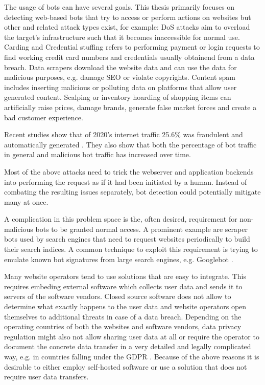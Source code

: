 \documentclass[
    fontsize=12pt,
    headings=small,
    parskip=half,           %
    bibliography=totoc,
    numbers=noenddot,       %
    open=any,               %
    final                   %
    ]{scrreprt}
\begin{document}
The usage of bots can have several goals. This thesis primarily focuses on detecting web-based bots that try to access or perform actions on websites but other and related attack types exist, for example:
DoS attacks aim to overload the target's infrastructure such that it becomes inaccessible for normal use. Carding and Credential stuffing refers to performing payment or login requests to find working credit card numbers and credentials usually obtainend from a data breach. Data scrapers download the website data and can use the data for malicious purposes, e.g. damage SEO or violate copyrights. Content spam includes inserting malicious or polluting data on platforms that allow user generated content. Scalping or inventory hoarding of shopping items can artificially raise prices, damage brands, generate false market forces and create a bad customer experience.

Recent studies show that of 2020's internet traffic 25.6\% was fraudulent and automatically generated \cite{BAD_BOT_REPORT2020} \cite{BAD_BOT_REPORT2021}. They also show that both the percentage of bot traffic in general and malicious bot traffic has increased over time.

Most of the above attacks need to trick the webserver and application backends into performing the request as if it had been initiated by a human. Instead of combating the resulting issues separately, bot detection could potentially mitigate many at once.

A complication in this problem space is the, often desired, requirement for non-malicious bots to be granted normal access. A prominent example are scraper bots used by search engines that need to request websites periodically to build their search indices. A common technique to exploit this requirement is trying to emulate known bot signatures from large search engines, e.g. Googlebot \cite{8421894}.

Many website operators tend to use solutions that are easy to integrate. This requires embeding external software which collects user data and sends it to servers of the software vendors. Closed source software does not allow to determine what exactly happens to the user data and website operators open themselves to additional threats in case of a data breach. Depending on the operating countries of both the websites and software vendors, data privacy regulation might also not allow sharing user data at all or require the operator to document the concrete data transfer in a very detailed and legally complicated way, e.g. in countries falling under the GDPR \cite{GDPR}. Because of the above reasons it is desirable to either employ self-hosted software or use a solution that does not require user data transfers.
\end{document}
